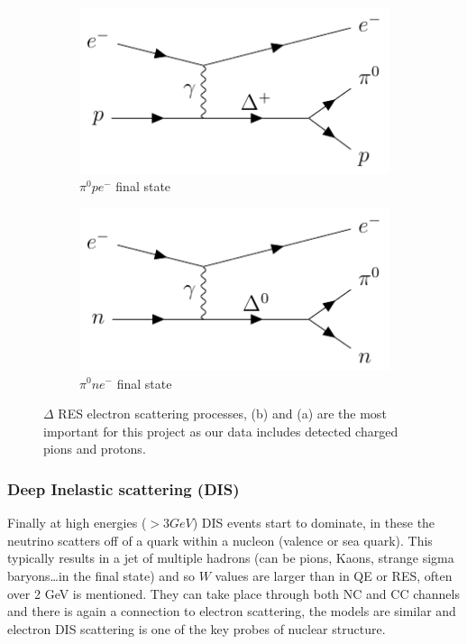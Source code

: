 \documentclass[a4paper,12pt]{article}
\begin{document}
\begin{figure}[H]
    \begin{subfigure}[b]{0.45\textwidth}
        \centering
        \includegraphics{figures/fds/RESel3.pdf}
        \caption{
            $\pi^0pe^-$ final state
        }
    \end{subfigure}
    \begin{subfigure}[b]{0.45\textwidth}
        \centering
        \includegraphics{figures/fds/RESel4.pdf}
        \caption{
            $\pi^0ne^-$ final state
        }
    \end{subfigure}
    \caption{
        $\Delta$ RES electron scattering processes, (b) and (a) are the most important for this project as our data includes detected charged pions and protons.
    }\label{fig:RESel_fd}
\end{figure}

\subsubsection{Deep Inelastic scattering (DIS)}
Finally at high energies ($>3\si{GeV}$) DIS events start to dominate, in these the neutrino scatters off of a quark within a nucleon (valence or sea quark).
This typically results in a jet of multiple hadrons (can be pions, Kaons, strange sigma baryons\ldots in the final state) and so $W$ values are larger than in QE or RES, often over 2 \si{GeV} is mentioned\cite{morfinRecentDevelopmentsNeutrino2012}.
They can take place through both NC and CC channels and there is again a connection to electron scattering, the models are similar and electron DIS scattering is one of the key probes of nuclear structure\cite{taylorDeepInelasticScattering1991}.
\end{document}
